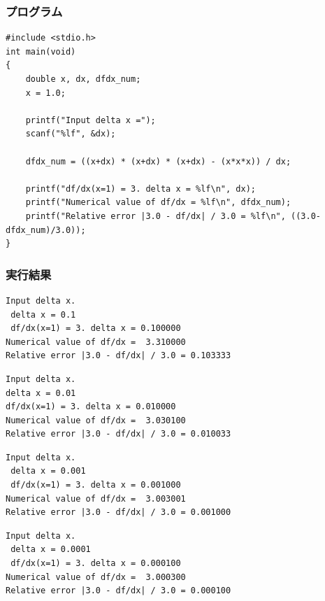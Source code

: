 \documentclass{jarticle}
\begin{document}
\subsubsection{プログラム\\}
\begin{breakbox}
\begin{verbatim}
#include <stdio.h>
int main(void)
{
    double x, dx, dfdx_num;
    x = 1.0;
    
    printf("Input delta x =");
    scanf("%lf", &dx);
    
    dfdx_num = ((x+dx) * (x+dx) * (x+dx) - (x*x*x)) / dx;
    
    printf("df/dx(x=1) = 3. delta x = %lf\n", dx);
    printf("Numerical value of df/dx = %lf\n", dfdx_num);
    printf("Relative error |3.0 - df/dx| / 3.0 = %lf\n", ((3.0-dfdx_num)/3.0));
}
\end{verbatim}
\end{breakbox}
\subsubsection{実行結果\\}
\begin{breakbox}
\begin{verbatim}
Input delta x. 
 delta x = 0.1 
 df/dx(x=1) = 3. delta x = 0.100000 
Numerical value of df/dx =  3.310000 
Relative error |3.0 - df/dx| / 3.0 = 0.103333 
\end{verbatim}
\end{breakbox}

\begin{breakbox}
\begin{verbatim}
Input delta x. 
delta x = 0.01
df/dx(x=1) = 3. delta x = 0.010000 
Numerical value of df/dx =  3.030100 
Relative error |3.0 - df/dx| / 3.0 = 0.010033 
\end{verbatim}
\end{breakbox}

\begin{breakbox}
\begin{verbatim}
Input delta x. 
 delta x = 0.001 
 df/dx(x=1) = 3. delta x = 0.001000 
Numerical value of df/dx =  3.003001 
Relative error |3.0 - df/dx| / 3.0 = 0.001000 
\end{verbatim}
\end{breakbox}

\begin{breakbox}
\begin{verbatim}
Input delta x. 
 delta x = 0.0001 
 df/dx(x=1) = 3. delta x = 0.000100 
Numerical value of df/dx =  3.000300 
Relative error |3.0 - df/dx| / 3.0 = 0.000100 
\end{verbatim}
\end{breakbox}
\end{document}
